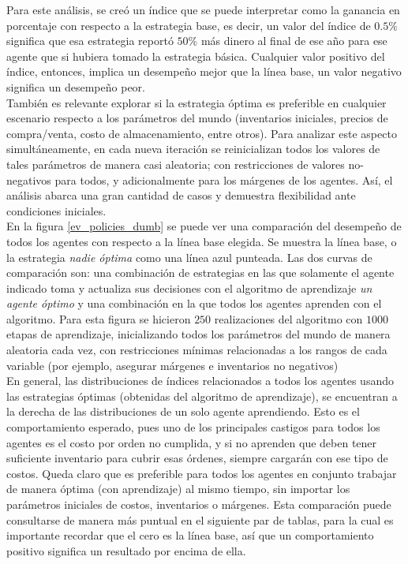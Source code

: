 Para este an\'alisis, se cre\'o un \'indice que se puede interpretar como la ganancia en porcentaje con respecto a la estrategia base, es decir, un valor del \'indice de $0.5\%$ significa que esa estrategia report\'o $50\%$ m\'as dinero al final de ese a\~no para ese agente que si hubiera tomado la estrategia b\'asica. Cualquier valor positivo del \'indice, entonces, implica un desempe\~no mejor que la l\'inea base, un valor negativo significa un desempe\~no peor.\\

Tambi\'en es relevante explorar si la estrategia \'optima es preferible en cualquier escenario respecto a los par\'ametros del mundo (inventarios iniciales, precios de compra/venta, costo de almacenamiento, entre otros). Para analizar este aspecto simult\'aneamente, en cada nueva iteraci\'on se reinicializan todos los valores de tales par\'ametros de manera casi aleatoria; con restricciones de valores no-negativos para todos, y adicionalmente para los m\'argenes de los agentes. As\'i, el an\'alisis abarca una gran cantidad de casos y demuestra flexibilidad ante condiciones iniciales.\\

En la figura \ref{ev_policies_dumb} se puede ver una comparaci\'on del desempe\~no de todos los agentes con respecto a la l\'inea base elegida. Se muestra la l\'inea base, o la estrategia \textit{nadie \'optima} como una l\'inea azul punteada. Las dos curvas de comparaci\'on son: una combinaci\'on de estrategias en las que solamente el agente indicado toma y actualiza sus decisiones con el algoritmo de aprendizaje \textit{un agente \'optimo} y una combinaci\'on en la que todos los agentes aprenden con el algoritmo. Para esta figura se hicieron $250$ realizaciones del algoritmo con $1000$ etapas de aprendizaje, inicializando todos los par\'ametros del mundo de manera aleatoria cada vez, con restricciones m\'inimas relacionadas a los rangos de cada variable (por ejemplo, asegurar m\'argenes e inventarios no negativos)\\

En general, las distribuciones de índices relacionados a todos los agentes usando las estrategias \'optimas (obtenidas del algoritmo de aprendizaje), se encuentran a la derecha de las distribuciones de un solo agente aprendiendo. Esto es el comportamiento esperado, pues uno de los principales castigos para todos los agentes es el costo por orden no cumplida, y si no aprenden que deben tener suficiente inventario para cubrir esas \'ordenes, siempre cargar\'an con ese tipo de costos. Queda claro que es preferible para todos los agentes en conjunto trabajar de manera \'optima (con aprendizaje) al mismo tiempo, sin importar los par\'ametros iniciales de costos, inventarios o m\'argenes. Esta comparaci\'on puede consultarse de manera m\'as puntual en el siguiente par de tablas, para la cual es importante recordar que el cero es la l\'inea base, as\'i que un comportamiento positivo significa un resultado por encima de ella.\\

